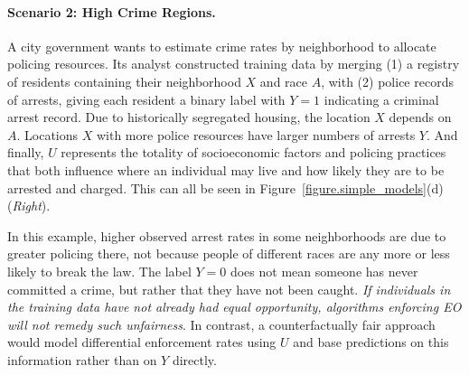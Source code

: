 \paragraph{Scenario 2: High Crime Regions.}
A city government wants to estimate crime rates by neighborhood to
allocate policing resources. Its analyst constructed training data
by merging (1) a registry of residents containing their neighborhood $X$
and race $A$, with (2) police records of arrests, giving each resident a
binary label with $Y = 1$ indicating a criminal arrest record.
Due to historically segregated housing, the location $X$ 
depends on $A$.
Locations $X$ with more police resources have larger numbers of
arrests $Y$.
And finally, $U$ represents the totality of socioeconomic factors
and policing practices that both influence where an individual may
live and how likely they are to be arrested and charged.
This can all be seen in Figure~\ref{figure.simple_models}(d)
(\emph{Right}).

In this example,
higher observed arrest rates in some neighborhoods
are due to greater policing there, not because people of different races
are any more or less likely to break the law.
The label $Y = 0$ does not
mean someone has never committed a crime, but rather that they have not
been caught.
{\em If individuals in the training data have not already had equal
  opportunity, algorithms enforcing EO will not remedy such unfairness}.
In contrast, a counterfactually fair approach would model
differential enforcement rates using $U$ and base predictions
on this information rather than on $Y$ directly.

